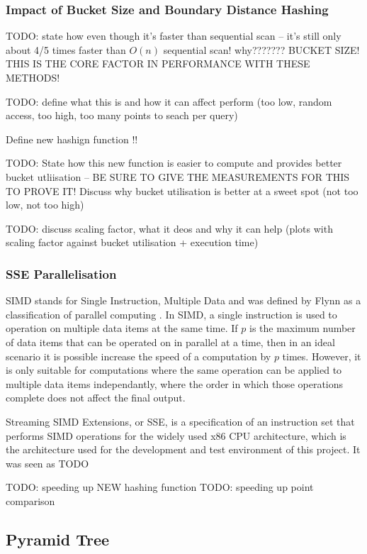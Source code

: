 \subsubsection{Impact of Bucket Size and Boundary Distance Hashing}

TODO: state how even though it's faster than sequential scan -- it's still only about 4/5 times faster than $O(n)$ sequential scan! why??????? BUCKET SIZE! THIS IS THE CORE FACTOR IN PERFORMANCE WITH THESE METHODS!

TODO: define what this is and how it can affect perform (too low, random access, too high, too many points to seach per query)

Define new hashign function !!

TODO: State how this new function is easier to compute and provides better bucket utliisation -- BE SURE TO GIVE THE MEASUREMENTS FOR THIS TO PROVE IT! Discuss why bucket utilisation is better at a sweet spot (not too low, not too high)

TODO: discuss scaling factor, what it deos and why it can help (plots with scaling factor against bucket utilisation + execution time)

\subsubsection{SSE Parallelisation}

SIMD stands for Single Instruction, Multiple Data and was defined by Flynn as a classification of parallel computing \cite{flynns-taxonomy}. In SIMD, a single instruction is used to operation on multiple data items at the same time. If $p$ is the maximum number of data items that can be operated on in parallel at a time, then in an ideal scenario it is possible increase the speed of a computation by $p$ times. However, it is only suitable for computations where the same operation can be applied to multiple data items independantly, where the order in which those operations complete does not affect the final output.

Streaming SIMD Extensions, or SSE, is a specification of an instruction set that performs SIMD operations for the widely used x86 CPU architecture\cite{sse}, which is the architecture used for the development and test environment of this project. It was seen as TODO

TODO: speeding up NEW hashing function
TODO: speeding up point comparison

\subsection{Pyramid Tree}

